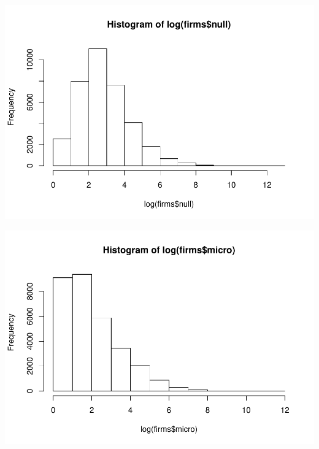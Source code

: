\documentclass[]{article}
\newenvironment{Shaded}{\begin{snugshade}}{\end{snugshade}}
\newcommand{\KeywordTok}[1]{\textcolor[rgb]{0.13,0.29,0.53}{\textbf{#1}}}
\newcommand{\OperatorTok}[1]{\textcolor[rgb]{0.81,0.36,0.00}{\textbf{#1}}}
\newcommand{\NormalTok}[1]{#1}
\begin{document}
\begin{Shaded}
\end{Shaded}

\includegraphics{TSLproject_files/figure-latex/unnamed-chunk-7-3.pdf}

\begin{Shaded}
\end{Shaded}

\includegraphics{TSLproject_files/figure-latex/unnamed-chunk-7-4.pdf}
\end{document}
